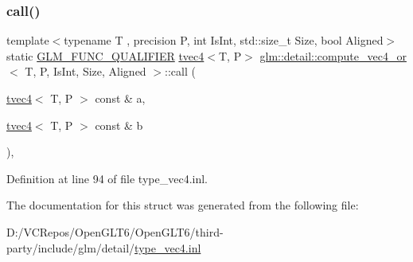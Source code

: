 \subsubsection{\texorpdfstring{call()}{call()}}
{\footnotesize\ttfamily template$<$typename T , precision P, int Is\+Int, std\+::size\+\_\+t Size, bool Aligned$>$ \\
static \mbox{\hyperlink{setup_8hpp_a33fdea6f91c5f834105f7415e2a64407}{G\+L\+M\+\_\+\+F\+U\+N\+C\+\_\+\+Q\+U\+A\+L\+I\+F\+I\+ER}} \mbox{\hyperlink{structglm_1_1tvec4}{tvec4}}$<$T, P$>$ \mbox{\hyperlink{structglm_1_1detail_1_1compute__vec4__or}{glm\+::detail\+::compute\+\_\+vec4\+\_\+or}}$<$ T, P, Is\+Int, Size, Aligned $>$\+::call (\begin{DoxyParamCaption}\item[{\mbox{\hyperlink{structglm_1_1tvec4}{tvec4}}$<$ T, P $>$ const \&}]{a,  }\item[{\mbox{\hyperlink{structglm_1_1tvec4}{tvec4}}$<$ T, P $>$ const \&}]{b }\end{DoxyParamCaption})\hspace{0.3cm}{\ttfamily [inline]}, {\ttfamily [static]}}



Definition at line 94 of file type\+\_\+vec4.\+inl.



The documentation for this struct was generated from the following file\+:\begin{DoxyCompactItemize}
\item 
D\+:/\+V\+C\+Repos/\+Open\+G\+L\+T6/\+Open\+G\+L\+T6/third-\/party/include/glm/detail/\mbox{\hyperlink{type__vec4_8inl}{type\+\_\+vec4.\+inl}}\end{DoxyCompactItemize}

